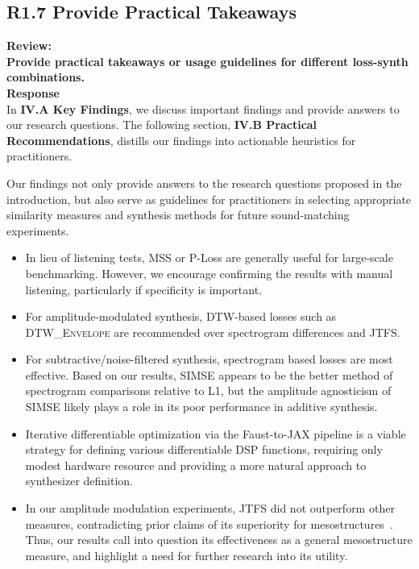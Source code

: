 \documentclass[11pt]{article}
\newcommand{\DTWEnv}{\textsc{DTW\_Envelope}}
\newcommand{\JTFS}{\textsc{JTFS}}
\begin{document}
\subsection{R1.7 Provide Practical Takeaways}
\label{R1.7}
\noindent\textbf{Review:} \\
\noindent \textbf{Provide practical takeaways or usage guidelines for different loss-synth combinations. } 
\\

\noindent\textbf{Response} \\

In \textbf{IV.A Key Findings}, we discuss important findings and provide answers to our research questions. The following section, \textbf{IV.B Practical Recommendations}, distills our findings into actionable heuristics for practitioners. 

\begin{displayquote}
    Our findings not only provide answers to the research questions proposed in the introduction, but also serve as guidelines for practitioners in selecting appropriate similarity measures and synthesis methods for future sound-matching experiments.
\begin{itemize}
    \item In lieu of listening tests, MSS or P-Loss are generally useful for large-scale benchmarking. However, we encourage confirming the results with manual listening, particularly if specificity is important. 
    \item For amplitude-modulated synthesis, DTW-based losses such as \DTWEnv{} are recommended over spectrogram differences and JTFS.
    \item  For subtractive/noise-filtered synthesis, spectrogram based losses are most effective. Based on our results, SIMSE appears to be the better method of spectrogram comparisons relative to L1, but the amplitude agnosticism of SIMSE likely plays a role in its poor performance in additive synthesis.
    \item Iterative differentiable optimization via the Faust-to-JAX pipeline is a viable strategy for defining various differentiable DSP functions, requiring only modest hardware resource and providing a more natural approach to synthesizer definition.
    \item In our amplitude modulation experiments, \JTFS{} did not outperform other measures, contradicting prior claims of its superiority for mesostructures~\cite{vahidi2023mesostructures}. Thus, our results call into question its effectiveness as a general mesostructure measure, and highlight a need for further research into its utility.
\end{itemize}

\end{displayquote}
\end{document}
